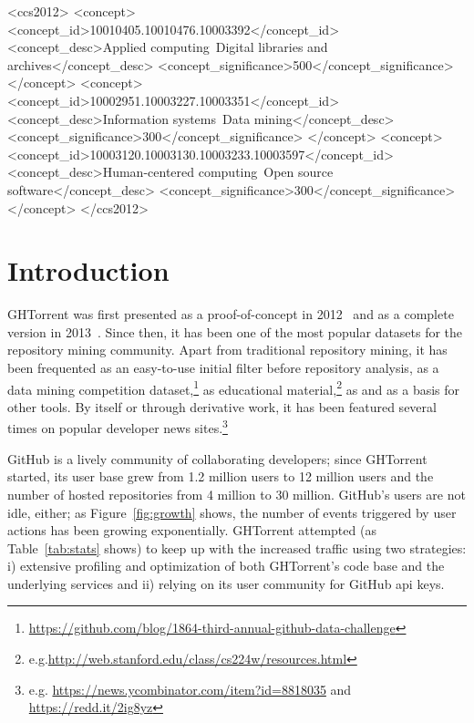 \documentclass{sig-alternate}
\begin{document}
%
%
\begin{CCSXML}
<ccs2012>
<concept>
<concept_id>10010405.10010476.10003392</concept_id>
<concept_desc>Applied computing~Digital libraries and archives</concept_desc>
<concept_significance>500</concept_significance>
</concept>
<concept>
<concept_id>10002951.10003227.10003351</concept_id>
<concept_desc>Information systems~Data mining</concept_desc>
<concept_significance>300</concept_significance>
</concept>
<concept>
<concept_id>10003120.10003130.10003233.10003597</concept_id>
<concept_desc>Human-centered computing~Open source software</concept_desc>
<concept_significance>300</concept_significance>
</concept>
</ccs2012>
\end{CCSXML}


%
%
\printccsdesc


\section{Introduction}

GHTorrent was first presented as a proof-of-concept in 2012~\cite{GS12} and as a
complete version in 2013~\cite{Gousi13}. Since then, it has been one of the most
popular datasets for the repository mining community. Apart from traditional
repository mining, it has been frequented as an easy-to-use initial filter
before repository analysis, as a data mining competition
dataset,\footnote{\url{https://github.com/blog/1864-third-annual-github-data-challenge}}
as educational
material,\footnote{e.g.\url{http://web.stanford.edu/class/cs224w/resources.html}}
as and as a basis for other tools.  By itself or through
derivative work, it has been featured several times on popular developer news
sites.\footnote{e.g. \url{https://news.ycombinator.com/item?id=8818035} and\\
\url{https://redd.it/2ig8yz}}

GitHub is a lively community of collaborating developers; since GHTorrent
started, its user base grew from 1.2 million users to 12 million users and the
number of hosted repositories from 4 million to 30 million. GitHub's users are not idle,
either; as Figure~\ref{fig:growth} shows, the number of events triggered by user
actions has been growing exponentially. GHTorrent attempted (as
Table~\ref{tab:stats} shows) to keep up with the increased traffic using two
strategies: i) extensive profiling and optimization of both GHTorrent's code
base and the underlying services and ii) relying on its user community for
GitHub {\sc api} keys.
\end{document}

